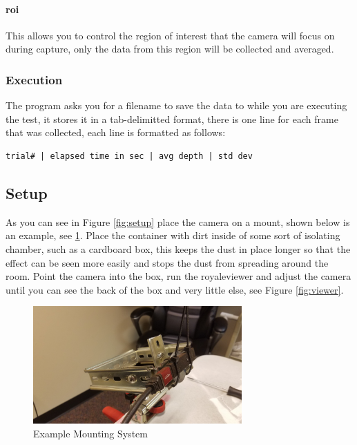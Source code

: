 \documentclass{article}
\begin{document}
			\paragraph{roi} This allows you to control the region of interest that the camera will focus on during capture, only the data from this region will be collected and averaged.
			
			\subsubsection{Execution} The program asks you for a filename to save the data to while you are executing the test, it stores it in a tab-delimitted format, there is one line for each frame that was collected, each line is formatted as follows:
			
			\begin{lstlisting}
trial# | elapsed time in sec | avg depth | std dev
			\end{lstlisting}
			
		\subsection{Setup}
			As you can see in Figure \ref{fig:setup} place the camera on a mount, shown below is an example, see \ref{fig:mount}. Place the container with dirt inside of some sort of isolating chamber, such as a cardboard box, this keeps the dust in place longer so that the effect can be seen more easily and stops the dust from spreading around the room.  Point the camera into the box, run the royaleviewer and adjust the camera until you can see the back of the box and very little else, see Figure \ref{fig:viewer}.
			
			\begin{figure}[h]
				\includegraphics[width=8cm]{./images/mounting_system.jpg}
				\centering
				\caption{Example Mounting System}
				\label{fig:mount}
			\end{figure}
		
\end{document}
